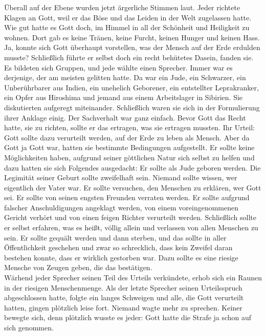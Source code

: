Überall auf der Ebene wurden jetzt ärgerliche Stimmen laut. Jeder richtete Klagen an Gott, weil er das Böse und das Leiden in der Welt zugelassen hatte. Wie gut hatte es Gott doch, im Himmel in all der Schönheit und Heiligkeit zu wohnen. Dort gab es keine Tränen, keine Furcht, keinen Hunger und keinen Hass. Ja, konnte sich Gott überhaupt vorstellen, was der Mensch auf der Erde erdulden musste? Schließlich führte er selbst doch ein recht behütetes Dasein, fanden sie.\\

Es bildeten sich Gruppen, und jede wählte einen Sprecher. Immer war es derjenige, der am meisten gelitten hatte. Da war ein Jude, ein Schwarzer, ein Unberührbarer aus Indien, ein unehelich Geborener, ein entstellter Leprakranker, ein Opfer aus Hiroshima und jemand aus einem Arbeitslager in Sibirien. Sie diskutierten aufgeregt miteinander. Schließlich waren sie sich in der Formulierung ihrer Anklage einig. Der Sachverhalt war ganz einfach. Bevor Gott das Recht hatte, sie zu richten, sollte er das ertragen, was sie ertragen mussten. Ihr Urteil: Gott sollte dazu verurteilt werden, auf der Erde zu leben als Mensch. Aber da Gott ja Gott war, hatten sie bestimmte Bedingungen aufgestellt. Er sollte keine Möglichkeiten haben, aufgrund seiner göttlichen Natur sich selbst zu helfen und dazu hatten sie sich Folgendes ausgedacht: Er sollte als Jude geboren werden. Die Legimität seiner Geburt sollte zweifelhaft sein. Niemand sollte wissen, wer eigentlich der Vater war. Er sollte versuchen, den Menschen zu erklären, wer Gott sei. Er sollte von seinen engsten Freunden verraten werden. Er sollte aufgrund falscher Anschuldigungen angeklagt werden, von einem voreingenommenen Gericht verhört und von einen feigen Richter verurteilt werden. Schließlich sollte er selbst erfahren, was es heißt, völlig allein und verlassen von allen Menschen zu sein. Er sollte gequält werden und dann sterben, und das sollte in aller Öffentlichkeit geschehen und zwar so schrecklich, dass kein Zweifel daran bestehen konnte, dass er wirklich gestorben war. Dazu sollte es eine riesige Mensche von Zeugen geben, die das bestätigen.\\

Wärhend jeder Sprecher seinen Teil des Urteils verkündete, erhob sich ein Raunen in der riesigen Menschenmenge. Als der letzte Sprecher seinen Urteilsspruch abgeschlossen hatte, folgte ein langes Schweigen und alle, die Gott verurteilt hatten, gingen plötzlich leise fort. Niemand wagte mehr zu sprechen. Keiner bewegte sich, denn plötzlich wusste es jeder: Gott hatte die Strafe ja schon auf sich genommen.

